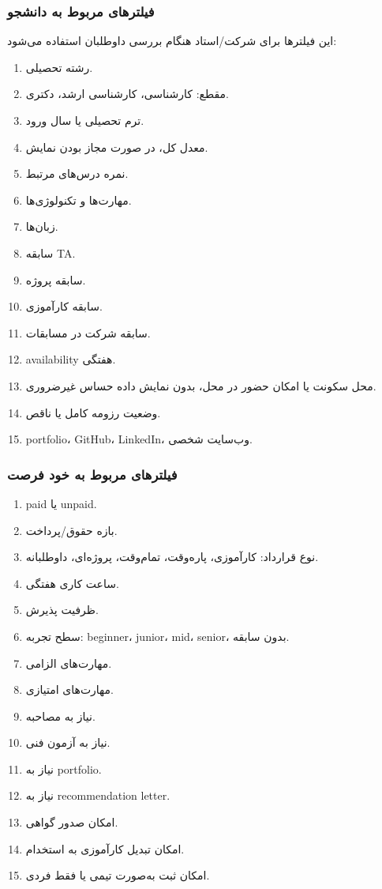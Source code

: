 \documentclass[12pt,a4paper]{article}
\begin{document}
\subsubsection{فیلترهای مربوط به دانشجو}
این فیلترها برای شرکت/استاد هنگام بررسی داوطلبان استفاده می‌شود:
\begin{enumerate}
\item رشته تحصیلی.
\item مقطع: کارشناسی، کارشناسی ارشد، دکتری.
\item ترم تحصیلی یا سال ورود.
\item معدل کل، در صورت مجاز بودن نمایش.
\item نمره درس‌های مرتبط.
\item مهارت‌ها و تکنولوژی‌ها.
\item زبان‌ها.
\item سابقه TA.
\item سابقه پروژه.
\item سابقه کارآموزی.
\item سابقه شرکت در مسابقات.
\item availability هفتگی.
\item محل سکونت یا امکان حضور در محل، بدون نمایش داده حساس غیرضروری.
\item وضعیت رزومه کامل یا ناقص.
\item portfolio، GitHub، LinkedIn، وب‌سایت شخصی.
\end{enumerate}

\subsubsection{فیلترهای مربوط به خود فرصت}
\begin{enumerate}
\item paid یا unpaid.
\item بازه حقوق/پرداخت.
\item نوع قرارداد: کارآموزی، پاره‌وقت، تمام‌وقت، پروژه‌ای، داوطلبانه.
\item ساعت کاری هفتگی.
\item ظرفیت پذیرش.
\item سطح تجربه: beginner، junior، mid، senior، بدون سابقه.
\item مهارت‌های الزامی.
\item مهارت‌های امتیازی.
\item نیاز به مصاحبه.
\item نیاز به آزمون فنی.
\item نیاز به portfolio.
\item نیاز به recommendation letter.
\item امکان صدور گواهی.
\item امکان تبدیل کارآموزی به استخدام.
\item امکان ثبت به‌صورت تیمی یا فقط فردی.
\end{enumerate}
\end{document}
